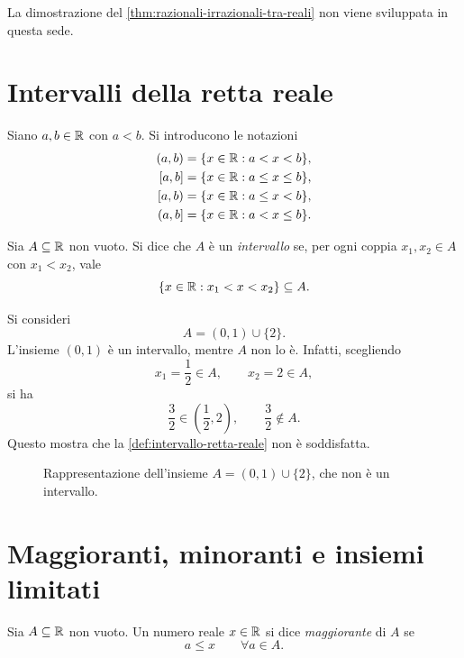 La dimostrazione del \cref{thm:razionali-irrazionali-tra-reali}
non viene sviluppata in questa sede.

\section{Intervalli della retta reale}
\label{sec:lez04-intervalli}

Siano \(a,b\in\mathbb{R}\) con \(a<b\). Si introducono le notazioni
\[
\begin{aligned}
  (a,b) &=\{x\in\R:a<x<b\},\\
  [a,b] &=\{x\in\R:a\le x\le b\},\\
  [a,b) &=\{x\in\R:a\le x<b\},\\
  (a,b] &=\{x\in\R:a<x\le b\}.
\end{aligned}
\]

\begin{definition}
\label{def:intervallo-retta-reale}
Sia \(A\subseteq\mathbb{R}\) non vuoto. Si dice che \(A\) è un
\emph{intervallo} se, per ogni coppia \(x_1,x_2\in A\) con
\(x_1<x_2\), vale
\[
  \{x\in\mathbb{R}:x_1<x<x_2\}\subseteq A.
\]
\end{definition}

\begin{example}
\label{ex:insieme-non-intervallo}
Si consideri
\[
  A=(0,1)\cup\{2\}.
\]
L'insieme \((0,1)\) è un intervallo, mentre \(A\) non lo è.
Infatti, scegliendo
\[
  x_1=\frac12\in A,
  \qquad x_2=2\in A,
\]
si ha
\[
  \frac32\in\left(\frac12,2\right),
  \qquad \frac32\notin A.
\]
Questo mostra che la \cref{def:intervallo-retta-reale} non è soddisfatta.
\end{example}

\begin{figure}[htbp]
  \centering
  
  \caption{Rappresentazione dell'insieme
  \(A=(0,1)\cup\{2\}\), che non è un intervallo.}
  \label{fig:insieme-non-intervallo}
\end{figure}

\section{Maggioranti, minoranti e insiemi limitati}
\label{sec:lez04-maggioranti-minoranti}

\begin{definition}[Maggiorante]
\label{def:maggiorante}
Sia \(A\subseteq\mathbb{R}\) non vuoto. Un numero reale \(x\in\mathbb{R}\)
si dice \emph{maggiorante} di \(A\) se
\[
  a\le x\qquad\forall a\in A.
\]
\end{definition}

